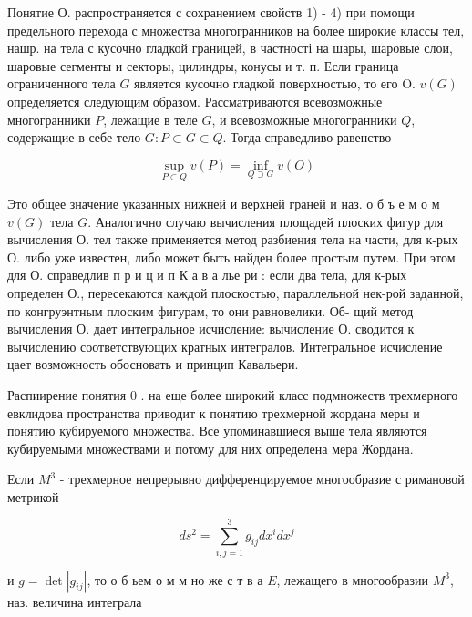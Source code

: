 \documentclass[10pt]{article}
\begin{document}
Понятие О. распространяется с сохранением свойств 1) - 4) при помощи предельного перехода с множества многогранников на более широкие классы тел, нашр. на тела с кусочно гладкой границей, в частності на шары, шаровые слои, шаровые сегменты и секторы, цилиндры, конусы и т. п. Если граница ограниченного тела $G$ является кусочно гладкой поверхностью, то его O. $v(G)$ определяется следующим образом. Рассматриваются всевозможные многогранники $P$, лежащие в теле $G$, и всевозможные многогранники $Q$, содержащие в себе тело $G: P \subset G \subset Q$. Тогда справедливо равенство



\[

\sup _{P \subset Q} v(P)=\inf _{Q \supset G} v(O)

\]



Это общее значение указанных нижней и верхней граней и наз. о б ъ е м о м $v(G)$ тела $G$. Аналогично случаю вычисления площадей плоских фигур для вычисления О. тел также применяется метод разбиения тела на части, для к-рых О. либо уже известен, либо может быть найден более простым путем. При этом для О. справедлив п р и ц и п К а в а лье ри : если два тела, для к-рых определен О., пересекаются каждой плоскостью, параллельной нек-рой заданной, по конгруэнтным плоским фигурам, то они равновелики. Об- щий метод вычисления О. дает интегральное исчисление: вычисление О. сводится к вычислению соответствующих кратных интегралов. Интегральное исчисление цает возможность обосновать и принцип Кавальери.



Распиирение понятия 0 . на еще более широкий класс подмножеств трехмерного евклидова пространства приводит к понятию трехмерной жордана меры и понятию кубируемого множества. Все упоминавшиеся выше тела являются кубируемыми множествами и потому для них определена мера Жордана.



Если $M^{3}$ - трехмерное непрерывно дифференцируемое многообразие с римановой метрикой



\[

d s^{2}=\sum_{i, j=1}^{3} g_{i j} d x^{i} d x^{j}

\]



и $g=\operatorname{det}\left|g_{i j}\right|$, то о б ьем о м м но же с т в а $E$, лежащего в многообразии $M^{3}$, наз. величина интеграла
\end{document}
